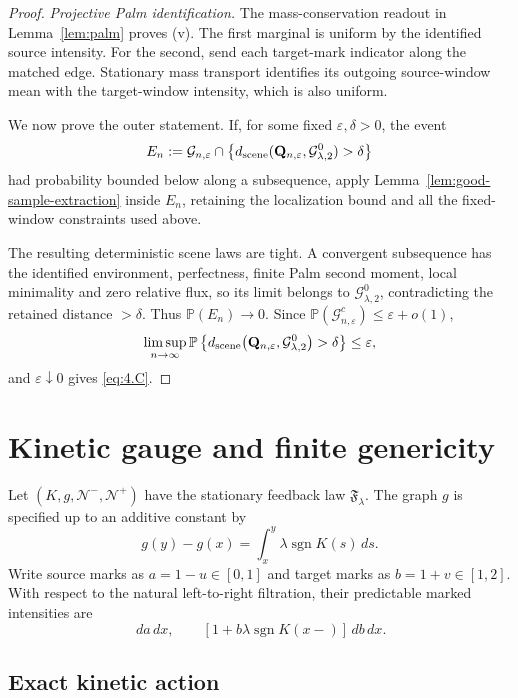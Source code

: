 \documentclass[11pt,reqno]{amsart}
\theoremstyle{definition}
\theoremstyle{remark}
\numberwithin{equation}{section}
\newcommand{\Pp}{\mathbb P}
\newcommand{\cF}{\mathfrak F}
\newcommand{\sgn}{\operatorname{sgn}}
\begin{document}
\begin{proof}
\emph{Projective Palm identification.}
The mass-conservation readout in Lemma~\ref{lem:palm} proves (v).
The first marginal is uniform by the identified source intensity.
For the second, send each target-mark indicator along the matched
edge.  Stationary mass transport identifies its outgoing source-window
mean with the target-window intensity, which is also uniform.

We now prove the outer statement.  If, for some fixed
\(\varepsilon,\delta>0\), the event
\[
E_n:=\mathcal G_{n,\varepsilon}\cap
\left\{d_{\rm scene}(\mathbf Q_{n,\varepsilon},\mathcal G_{\lambda,2}^0)>\delta\right\}
\]
had probability bounded below along a subsequence, apply
Lemma~\ref{lem:good-sample-extraction} inside \(E_n\), retaining the
localization bound and all the fixed-window constraints used above.

The resulting deterministic scene laws are tight.  A convergent subsequence
has the identified environment, perfectness, finite Palm second moment,
local minimality and zero relative flux, so its limit belongs to
\(\mathcal G_{\lambda,2}^0\), contradicting the retained distance
\(>\delta\).
Thus \(\Pp(E_n)\to0\).  Since
\(\Pp(\mathcal G_{n,\varepsilon}^c)\le\varepsilon+o(1)\),
\[
\limsup_{n\to\infty}
\Pp\left\{
d_{\rm scene}\bigl(
\mathbf Q_{n,\varepsilon},\mathcal G_{\lambda,2}^0
\bigr)>\delta
\right\}
\le\varepsilon,
\]
and \(\varepsilon\downarrow0\) gives \eqref{eq:4.C}.
\end{proof}

\section{Kinetic gauge and finite genericity}
\label{sec:kinetic}

Let \((K,g,\mathcal N^-,\mathcal N^+)\) have the stationary feedback law
\(\cF_\lambda\).  The graph \(g\) is specified up to an additive constant by
\begin{equation}
g(y)-g(x)=\int_x^y\lambda\sgn K(s)\,ds.
\label{eq:7.1}
\end{equation}
Write source marks as \(a=1-u\in[0,1]\) and target marks as
\(b=1+v\in[1,2]\).  With respect to the natural left-to-right
filtration, their predictable marked intensities are
\begin{equation}
[1-a\lambda\sgn K(x-)]\,da\,dx,
\qquad
[1+b\lambda\sgn K(x-)]\,db\,dx.
\label{eq:7.2}
\end{equation}

\subsection{Exact kinetic action}
\end{document}
